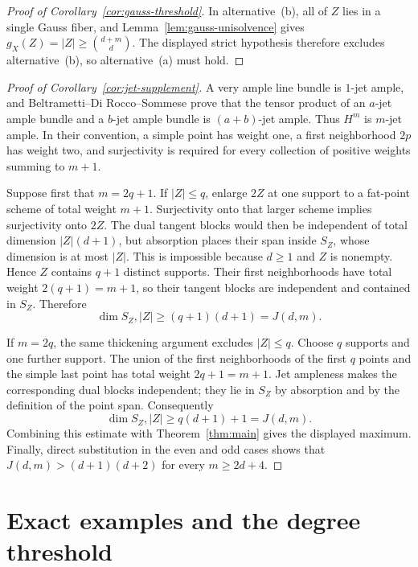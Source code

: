 \documentclass[11pt]{article}
\begin{document}
\begin{proof}[Proof of Corollary~\ref{cor:gauss-threshold}]
In alternative~(b), all of $Z$ lies in a single Gauss fiber, and
Lemma~\ref{lem:gauss-unisolvence} gives
$g_X(Z)=|Z|\geq\binom{d+m}{d}$.  The displayed strict hypothesis therefore
excludes alternative~(b), so alternative~(a) must hold.
\end{proof}

\begin{proof}[Proof of Corollary~\ref{cor:jet-supplement}]
A very ample line bundle is $1$-jet ample, and
Beltrametti--Di Rocco--Sommese
\cite[Proposition~2.3]{BeltramettiDiRoccoSommese1999} prove that the tensor
product of an $a$-jet ample bundle and a $b$-jet ample bundle is
$(a+b)$-jet ample.  Thus $H^m$ is $m$-jet ample.  In their convention, a
simple point has weight one, a first neighborhood $2p$ has weight two, and
surjectivity is required for every collection of positive weights summing to
$m+1$.

Suppose first that $m=2q+1$.  If $|Z|\leq q$, enlarge $2Z$ at one support to
a fat-point scheme of total weight $m+1$.  Surjectivity onto that larger
scheme implies surjectivity onto $2Z$.  The dual tangent blocks would then be
independent of total dimension $|Z|(d+1)$, but absorption places their span
inside $S_Z$, whose dimension is at most $|Z|$.  This is impossible because
$d\geq1$ and $Z$ is nonempty.  Hence $Z$ contains $q+1$ distinct supports.
Their first neighborhoods have total weight $2(q+1)=m+1$, so their tangent
blocks are independent and contained in $S_Z$.  Therefore
\[
 \dim S_Z,|Z|\geq(q+1)(d+1)=J(d,m).
\]

If $m=2q$, the same thickening argument excludes $|Z|\leq q$.  Choose $q$
supports and one further support.  The union of the first neighborhoods of
the first $q$ points and the simple last point has total weight
$2q+1=m+1$.  Jet ampleness makes the corresponding dual blocks independent;
they lie in $S_Z$ by absorption and by the definition of the point span.
Consequently
\[
 \dim S_Z,|Z|\geq q(d+1)+1=J(d,m).
\]
Combining this estimate with Theorem~\ref{thm:main} gives the displayed
maximum.  Finally, direct substitution in the even and odd cases shows that
$J(d,m)>(d+1)(d+2)$ for every $m\geq2d+4$.
\end{proof}

\section{Exact examples and the degree threshold}\label{sec:examples}
\end{document}
